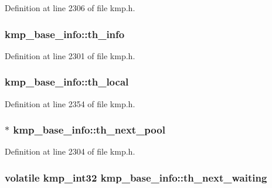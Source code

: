 Definition at line 2306 of file kmp.\-h.

\hypertarget{structkmp__base__info_a922712159f3ad59ee5d79a182151f21b}{
\subsubsection[{th\-\_\-info}]{ kmp\-\_\-base\-\_\-info\-::th\-\_\-info}}\label{structkmp__base__info_a922712159f3ad59ee5d79a182151f21b}


Definition at line 2301 of file kmp.\-h.

\hypertarget{structkmp__base__info_a28684ea3001b59465f162155f2743ca1}{
\subsubsection[{th\-\_\-local}]{ kmp\-\_\-base\-\_\-info\-::th\-\_\-local}}\label{structkmp__base__info_a28684ea3001b59465f162155f2743ca1}


Definition at line 2354 of file kmp.\-h.

\hypertarget{structkmp__base__info_a39a9989f4fd9476ef0868aeff1d5c003}{
\subsubsection[{th\-\_\-next\-\_\-pool}]{$\ast$ kmp\-\_\-base\-\_\-info\-::th\-\_\-next\-\_\-pool}}\label{structkmp__base__info_a39a9989f4fd9476ef0868aeff1d5c003}


Definition at line 2304 of file kmp.\-h.

\hypertarget{structkmp__base__info_a4fdcd4b88bd79f9d8eaacd8d176a6e3d}{
\subsubsection[{th\-\_\-next\-\_\-waiting}]{ volatile kmp\-\_\-int32 kmp\-\_\-base\-\_\-info\-::th\-\_\-next\-\_\-waiting}}\label{structkmp__base__info_a4fdcd4b88bd79f9d8eaacd8d176a6e3d}


